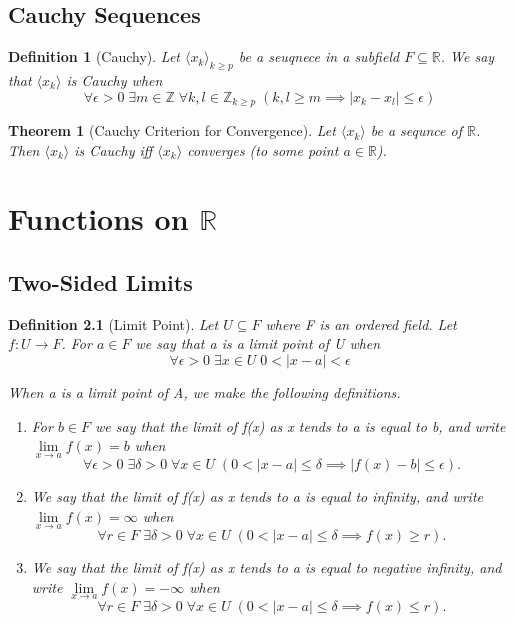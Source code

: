 \documentclass[11pt, oneside]{book}
\theoremstyle{break}
\newtheorem{thm}{Theorem}[section]
\newtheorem{defn}{Definition}[section]
\newcommand{\bb}[1]{\mathbb{#1}}		%
\begin{document}
\section{Cauchy Sequences}

\begin{defn}[Cauchy]
	Let $\langle x_k \rangle_{k \geq p}$ be a seuqnece in a subfield $F \subseteq \bb{R}$. We say that $\langle x_k \rangle$ is Cauchy when
	\[
		\forall \epsilon > 0 \; \exists m \in \bb{Z} \; \forall k, l \in \bb{Z}_{k \geq p}\; (k, l \geq m \implies |x_k - x_l| \leq \epsilon)
	\]
\end{defn}

\begin{thm}[Cauchy Criterion for Convergence]
	Let $\langle x_k \rangle$ be a sequnce of $\bb{R}$. Then $\langle x_k \rangle$ is Cauchy iff $\langle x_k \rangle$ converges (to some point $a \in \bb{R}$).
\end{thm}



\chapter{Functions on \texorpdfstring{$\bb{R}$}{R}}


\section{Two-Sided Limits}

\begin{defn}[Limit Point]
	Let $U \subseteq F$ where F is an ordered field. Let $f: U \to F$. For $a \in F$ we say that a is a limit point of U when
	\[
		\forall \epsilon > 0 \; \exists x \in U \; 0 < |x - a| < \epsilon
	\]

	When a is a limit point of A, we make the following definitions.
	\begin{enumerate}
		\item For $b \in F$ we say that the limit of f(x) as x tends to a is equal to b, and write $\lim\limits_{x \to a} f(x) = b$ when
			\[
				\forall \epsilon > 0 \; \exists \delta > 0 \; \forall x \in U \; (0 < |x - a| \leq \delta \implies |f(x) - b| \leq \epsilon).
			\]
		\item We say that the limit of f(x) as x tends to a is equal to infinity, and write $\lim\limits_{x \to a} f(x) = \infty$ when
			\[
				\forall r \in F \; \exists \delta > 0 \; \forall x \in U \; (0 < |x - a| \leq \delta \implies f(x) \geq r).
			\]
		\item We say that the limit of f(x) as x tends to a is equal to negative infinity, and write $\lim\limits_{x \to a}f(x) = -\infty$ when
			\[
				\forall r \in F \; \exists \delta > 0 \; \forall x \in U \; (0 < |x - a| \leq \delta \implies f(x) \leq r).
			\]
	\end{enumerate}
\end{defn}
\end{document}
